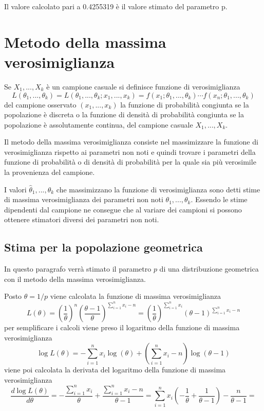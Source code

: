 \documentclass[]{book}
\begin{document}
Il valore calcolato pari a 0.4255319 è il valore stimato del parametro
p.

\section{Metodo della massima
verosimiglianza}\label{metodo-della-massima-verosimiglianza}

Se \(X_1,..., X_k\) è un campione casuale si definisce funzione di
verosimiglianza
\[L(\theta_1,...,\theta_k) = L(\theta_1,...,\theta_k; x_1,...,x_k) = f(x_1;\theta_1,...,\theta_k) \cdots f(x_n;\theta_1,...,\theta_k)\]
del campione osservato \((x_1,...,x_k)\) la funzione di probabilità
congiunta se la popolazione è discreta o la funzione di densità di
probabilità congiunta se la popolazione è assolutamente continua, del
campione casuale \(X_1,..., X_k\).

Il metodo della massima verosimiglianza consiste nel massimizzare la
funzione di verosimiglianza rispetto ai parametri non noti e quindi
trovare i parametri della funzione di probabilità o di densità di
probabilità per la quale sia più verosimile la provenienza del campione.

I valori \(\hat\theta_1,...,\hat\theta_k\) che massimizzano la funzione
di verosimiglianza sono detti stime di massima verosimiglianza dei
parametri non noti \(\theta_1,...,\theta_k\). Essendo le stime
dipendenti dal campione ne consegue che al variare dei campioni si
possono ottenere stimatori diversi dei parametri non noti.

\subsection{Stima per la popolazione
geometrica}\label{stima-per-la-popolazione-geometrica-1}

In questo paragrafo verrà stimato il parametro \(p\) di una
distribuzione geometrica con il metodo della massima verosimiglianza.

Posto \(\theta = 1/p\) viene calcolata la funzione di massima
verosimiglianza
\[L(\theta) = \left(\frac{1}{\theta}\right)^n \left(\frac{\theta-1}{\theta}\right)^{\sum_{i=1}^nx_i-n} = \left(\frac{1}{\theta}\right)^{\sum_{i=1}^nx_i} \left(\theta-1\right)^{\sum_{i=1}^nx_i-n}\]
per semplificare i calcoli viene preso il logaritmo della funzione di
massima verosimiglianza
\[\log L(\theta) =  -\sum_{i=1}^nx_i \log(\theta) + \left(\sum_{i=1}^nx_i-n\right) \log(\theta - 1) \]
viene poi calcolata la derivata del logaritmo della funzione di massima
verosimiglianza
\[\frac{d \log L(\theta)}{d \theta} = - \frac{\sum_{i=1}^nx_i}{\theta} + \frac{\sum_{i=1}^nx_i-n}{\theta - 1} = \sum_{i=1}^nx_i \left(-\frac{1}{\theta} + \frac{1}{\theta - 1}  \right) - \frac{n}{\theta - 1} =\]
\end{document}

